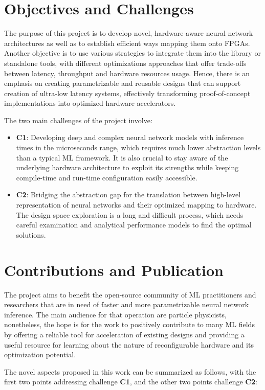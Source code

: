 \section{Objectives and Challenges}
The purpose of this project is to develop novel, hardware-aware neural network architectures as well as to establish efficient ways mapping them onto FPGAs. Another objective is to use various strategies to integrate them into the \hlsml library or standalone tools, with different optimizations approaches that offer trade-offs between latency, throughput and hardware resources usage. Hence, there is an emphasis on creating parametrizable and reusable designs that can support creation of ultra-low latency systems, effectively transforming proof-of-concept implementations into optimized hardware accelerators.

The two main challenges of the project involve:

\begin{itemize}
  \item \textbf{C1}: Developing deep and complex neural network models with inference times in the microseconds range, which requires much lower abstraction levels than a typical ML framework. It is also crucial to stay aware of the underlying hardware architecture to exploit its strengths while keeping compile-time and run-time configuration easily accessible.
  \item \textbf{C2}: Bridging the abstraction gap for the translation between high-level representation of neural networks and their optimized mapping to hardware. The design space exploration is a long and difficult process, which needs careful examination and analytical performance models to find the optimal solutions.
\end{itemize}


\section{Contributions and Publication}
The project aims to benefit the open-source community of ML practitioners and researchers that are in need of faster and more parametrizable neural network inference. The main audience for that operation are particle physicists, nonetheless, the hope is for the work to positively contribute to many ML fields by offering a reliable tool for acceleration of existing designs and providing a useful resource for learning about the nature of reconfigurable hardware and its optimization potential.

The novel aspects proposed in this work can be summarized as follows, with the first two points addressing challenge \textbf{C1}, and the other two points challenge \textbf{C2}:


